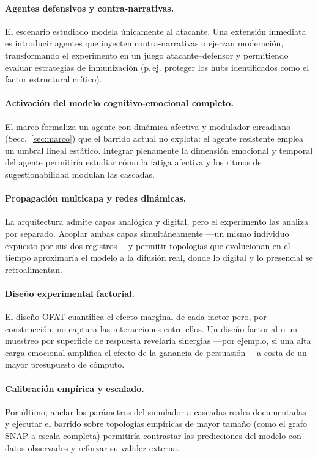 \documentclass[12pt]{extarticle}
\numberwithin{equation}{section}
\begin{document}
\paragraph{Agentes defensivos y contra-narrativas.} El escenario estudiado modela únicamente al atacante. Una extensión inmediata es introducir agentes que inyecten contra-narrativas o ejerzan moderación, transformando el experimento en un juego atacante--defensor y permitiendo evaluar estrategias de inmunización (p.\,ej. proteger los hubs identificados como el factor estructural crítico).

\paragraph{Activación del modelo cognitivo-emocional completo.} El marco formaliza un agente con dinámica afectiva y modulador circadiano (Secc.~\ref{sec:marco}) que el barrido actual no explota: el agente resistente emplea un umbral lineal estático. Integrar plenamente la dimensión emocional y temporal del agente permitiría estudiar cómo la fatiga afectiva y los ritmos de sugestionabilidad modulan las cascadas.

\paragraph{Propagación multicapa y redes dinámicas.} La arquitectura admite capas analógica y digital, pero el experimento las analiza por separado. Acoplar ambas capas simultáneamente —un mismo individuo expuesto por sus dos registros— y permitir topologías que evolucionan en el tiempo aproximaría el modelo a la difusión real, donde lo digital y lo presencial se retroalimentan.

\paragraph{Diseño experimental factorial.} El diseño OFAT cuantifica el efecto marginal de cada factor pero, por construcción, no captura las interacciones entre ellos. Un diseño factorial o un muestreo por superficie de respuesta revelaría sinergias —por ejemplo, si una alta carga emocional amplifica el efecto de la ganancia de persuasión— a costa de un mayor presupuesto de cómputo.

\paragraph{Calibración empírica y escalado.} Por último, anclar los parámetros del simulador a cascadas reales documentadas~\cite{Vosoughi2018} y ejecutar el barrido sobre topologías empíricas de mayor tamaño (como el grafo SNAP a escala completa) permitiría contrastar las predicciones del modelo con datos observados y reforzar su validez externa.
\end{document}
